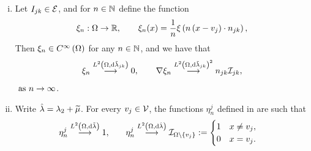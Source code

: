 \begin{lemma} \label{lem:SI-SmoothFunctionsResults}
	\begin{enumerate}[(i)]
		\item Let $I_{jk}\in\mathcal{E}$, and for $n\in\mathbb{N}$ define the function
		\begin{align*}
			\xi_n:\Omega\rightarrow\mathbb{R}, \qquad \xi_n(x) = \frac{1}{n}\xi\left( n\left( x-v_j \right)\cdot n_{jk} \right),
		\end{align*}
		Then $\xi_n\in C^{\infty}\left( \Omega \right)$ for any $n\in\mathbb{N}$, and we have that
		\begin{align*}
			\xi_n \overset{L^{2}\left( \Omega,\mathrm{d}\tilde{\lambda}_{jk} \right)}{\longrightarrow} 0, \qquad
			\nabla\xi_n \overset{L^{2}\left( \Omega,\mathrm{d}\tilde{\lambda}_{jk} \right)^2}{\longrightarrow} n_{jk}\mathcal{I}_{jk},
		\end{align*}
		$\ \text{as} \ n \rightarrow\infty$.
		\item Write $\hat{\lambda} = \lambda_2 + \widetilde{\mu}$.
		For every $v_j\in\mathcal{V}$, the functions $\eta_n^j$ defined in  are such that
		\begin{align*}
			\eta_n^j \overset{L^{2}\left( \Omega,\mathrm{d}\tilde{\lambda} \right)}{\longrightarrow} 1,
			&\qquad
			\eta_n^j \overset{L^{2}\left( \Omega,\mathrm{d}\hat{\lambda} \right)}{\longrightarrow} \mathcal{I}_{\Omega\setminus\left\{ v_j \right\}} := \begin{cases} 1 & x\neq v_j, \\ 0 & x=v_j. \end{cases}
		\end{align*}
	\end{enumerate}
\end{lemma}
